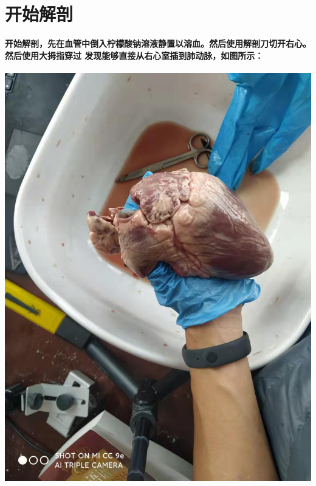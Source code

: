 \documentclass[final,11pt,oneside,UTF8]{report}
\begin{document}
\section{开始解剖}
\paragraph{
    开始解剖，先在血管中倒入柠檬酸钠溶液静置以溶血。然后使用解剖刀切开右心。然后使用大拇指穿过
    发现能够直接从右心室插到肺动脉，如图所示：
}
\begin{center}
    \includegraphics[scale=0.1,angle=0]{photos/stickR.jpg}
\end{center}
\end{document}
